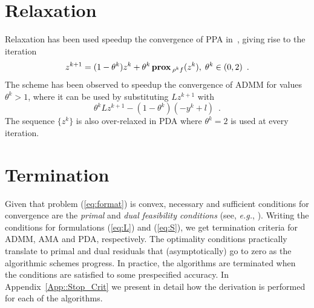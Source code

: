 \documentclass[openany]{now}
\newcommand{\eg}{{\it e.g.}}
\newcommand{\prox}{\mathop{\bf prox}}
\begin{document}
\section{Relaxation}\label{sec:over_Relax}
Relaxation has been used speedup the convergence of PPA in~\cite{Eckstein_dr}, giving rise to the iteration
\[
 z^{k+1} = (1-\theta^k)z^k+\theta^k\prox{_{\rho^kf}}(z^k), \; \theta^k\in(0,2)\enspace.
\]
The scheme has been observed to speedup the convergence of ADMM for values $\theta^k>1$, where it can be used by substituting $Lz^{k+1}$ with
\[
 \theta^kLz^{k+1}-(1-\theta^k)(-y^k+l)\enspace.
\]
The sequence $\{z^k\}$ is also over-relaxed in PDA where $\theta^k=2$ is used at every iteration.

\section{Termination}\label{sec:term}
Given that problem (\ref{eq:format}) is convex, necessary and sufficient conditions for convergence are the \emph{primal} and \emph{dual feasibility conditions} (see, \eg, \cite[Chapter~5]{cvxbook}). Writing the conditions for formulations (\ref{eq:L}) and (\ref{eq:S}), we get termination criteria for ADMM, AMA and PDA, respectively. The optimality conditions practically translate to primal and dual residuals that (asymptotically) go to zero as the algorithmic schemes progress. In practice, the algorithms are terminated when the conditions are satisfied to some prespecified accuracy. In Appendix~\ref{App::Stop_Crit} we present in detail how the derivation is performed for each of the algorithms.
\end{document}
